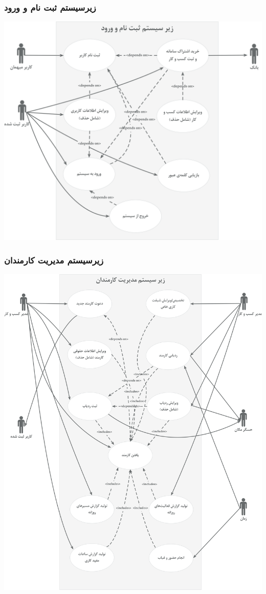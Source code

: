 \subsubsection{زیرسیستم ثبت نام و ورود}
\includegraphics[width = \textwidth]{images/registration-man}
\subsubsection{زیرسیستم مدیریت کارمندان}
\includegraphics[width = \textwidth]{images/employee-man}
